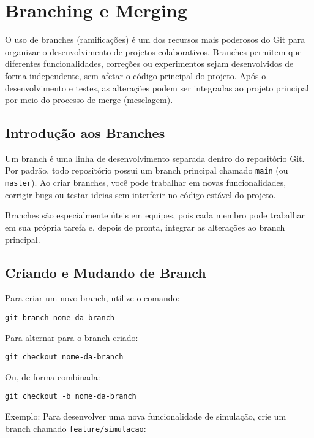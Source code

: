 \newpage
\section{Branching e Merging}

O uso de branches (ramificações) é um dos recursos mais poderosos do Git para organizar o desenvolvimento de projetos colaborativos. Branches permitem que diferentes funcionalidades, correções ou experimentos sejam desenvolvidos de forma independente, sem afetar o código principal do projeto. Após o desenvolvimento e testes, as alterações podem ser integradas ao projeto principal por meio do processo de merge (mesclagem).

\subsection{Introdução aos Branches}

Um branch é uma linha de desenvolvimento separada dentro do repositório Git. Por padrão, todo repositório possui um branch principal chamado \texttt{main} (ou \texttt{master}). Ao criar branches, você pode trabalhar em novas funcionalidades, corrigir bugs ou testar ideias sem interferir no código estável do projeto.

Branches são especialmente úteis em equipes, pois cada membro pode trabalhar em sua própria tarefa e, depois de pronta, integrar as alterações ao branch principal.

\subsection{Criando e Mudando de Branch}

Para criar um novo branch, utilize o comando:

\begin{lstlisting}[style=shellstyle]
git branch nome-da-branch
\end{lstlisting}

Para alternar para o branch criado:

\begin{lstlisting}[style=shellstyle]
git checkout nome-da-branch
\end{lstlisting}

Ou, de forma combinada:

\begin{lstlisting}[style=shellstyle]
git checkout -b nome-da-branch
\end{lstlisting}

Exemplo: Para desenvolver uma nova funcionalidade de simulação, crie um branch chamado \texttt{feature/simulacao}:

